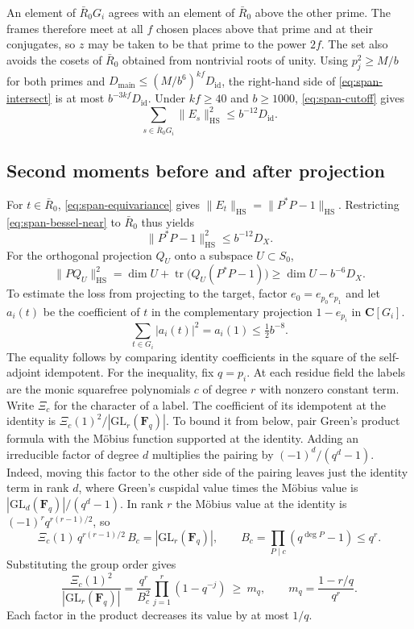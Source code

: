 An element of \(\bar R_0G_i\) agrees with an element of \(\bar R_0\) above
the other prime. The frames therefore meet at all \(f\) chosen places
above that prime and at their conjugates, so \(z\) may be taken to be
that prime to the power \(2f\). The set also avoids the cosets of
\(\bar R_0\) obtained from nontrivial roots of unity. Using \(p_j^2\geq M/b\)
for both primes and \(D_{\mathrm{main}}\le (M/b^6)^{kf}D_{\mathrm{id}}\), the
right-hand side of \eqref{eq:span-intersect} is at most
\(b^{-3kf}D_{\mathrm{id}}\). Under \(kf\geq 40\) and \(b\ge 1000\),
\eqref{eq:span-cutoff} gives
\begin{equation}\label{eq:span-bessel-near}
 \sum_{s\in\bar R_0G_i}\|E_s\|_{\mathrm{HS}}^2
 \leq b^{-12}D_{\mathrm{id}}.
\end{equation}

\subsection{Second moments before and after projection}

For \(t\in\bar R_0\), \eqref{eq:span-equivariance} gives
\(\|E_t\|_{\mathrm{HS}}=\|P^*P-1\|_{\mathrm{HS}}\).
Restricting \eqref{eq:span-bessel-near} to \(\bar R_0\) thus yields
\begin{equation}\label{eq:span-gram-isometry}
 \|P^*P-1\|_{\mathrm{HS}}^2\leq b^{-12}D_X.
\end{equation}
For the orthogonal projection \(Q_U\) onto a subspace \(U\subset S_0\),
\[
 \|P Q_U\|_{\mathrm{HS}}^2
 = \dim U+\operatorname{tr}\bigl(Q_U(P^*P-1)\bigr)
 \geq \dim U-b^{-6}D_X.
\]
To estimate the loss from projecting to the target, factor
\(e_0=e_{p_0}e_{p_1}\) and let \(a_i(t)\) be the coefficient of \(t\) in the
complementary projection \(1-e_{p_i}\) in \(\mathbf C[G_i]\).
\[
 \sum_{t\in G_i}|a_i(t)|^2=a_i(1)\leq \tfrac12 b^{-8}.
\]
The equality follows by comparing identity coefficients in the square of
the self-adjoint idempotent. For the inequality, fix \(q=p_i\).
At each residue field the labels are the monic squarefree polynomials
\(c\) of degree \(r\) with nonzero constant term. Write \(\Xi_c\) for
the character of a label. The coefficient of its idempotent at the
identity is \(\Xi_c(1)^2/|\mathrm{GL}_r(\mathbf F_q)|\).
To bound it from below, pair Green's product formula with the Möbius
function supported at the identity. Adding an irreducible factor of
degree \(d\) multiplies the pairing by \((-1)^d/(q^d-1)\).
Indeed, moving this factor to the other side of the pairing leaves just
the identity term in rank \(d\), where Green's cuspidal value times the
Möbius value is \(|\mathrm{GL}_d(\mathbf F_q)|/(q^d-1)\).
In rank \(r\) the Möbius value at the identity is \((-1)^r q^{r(r-1)/2}\),
so
\[
 \Xi_c(1)\,q^{r(r-1)/2}\,B_c=|\mathrm{GL}_r(\mathbf F_q)|,\qquad
 B_c=\prod_{P\mid c}(q^{\deg P}-1)\le q^r.
\]
Substituting the group order gives
\[
 \frac{\Xi_c(1)^2}{|\mathrm{GL}_r(\mathbf F_q)|}
   =\frac{q^r}{B_c^2}\prod_{j=1}^r(1-q^{-j})
   \ \ge\ m_q,\qquad m_q=\frac{1-r/q}{q^r}.
\]
Each factor in the product decreases its value by at most \(1/q\).

